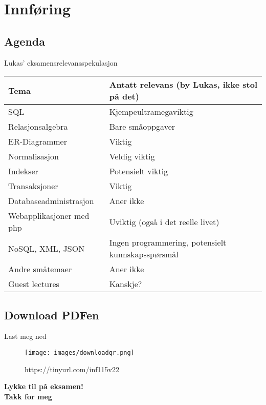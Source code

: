 
\begin{frame}[t,plain]
    \titlepage
\end{frame}

\section{Innføring}
\subsection*{Agenda}
\begin{frame}
    \tableofcontents
\end{frame}

\begin{frame}{Lukas' eksamensrelevansspekulasjon}
    \begin{tabular}{l|l}
    Tema & Antatt relevans (by Lukas, ikke stol på det)\\\hline\pause
    SQL & Kjempeultramegaviktig\\\pause
    Relasjonsalgebra & Bare småoppgaver\\\pause
    ER-Diagrammer & Viktig\\\pause
    Normalisasjon & Veldig viktig\\\pause
    Indekser & Potensielt viktig\\\pause
    Transaksjoner & Viktig\\\pause
    Databaseadministrasjon & Aner ikke\\\pause
    Webapplikasjoner med php & Uviktig (også i det reelle livet)\\\pause
    NoSQL, XML, JSON & Ingen programmering, potensielt kunnskapsspørsmål\\\pause
    Andre småtemaer & Aner ikke\\\pause
    Guest lectures & Kanskje?
    \end{tabular}
\end{frame}

\subsection*{Download PDFen}
\begin{frame}{Last meg ned}
    \begin{figure}
        \centering
        \texttt{[image: images/downloadqr.png]}
        \caption{https://tinyurl.com/inf115v22}
        \label{fig:qrcode}
    \end{figure}
\end{frame}










\begin{frame}
\begin{center}
\begin{Large}
\textbf{Lykke til på eksamen!\\[5mm]
Takk for meg}
\end{Large}
\end{center}  
\end{frame}